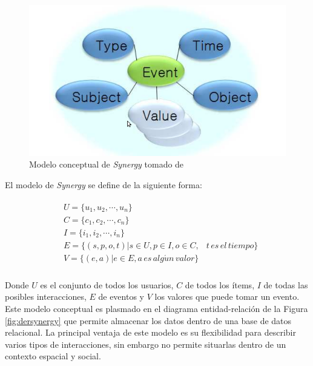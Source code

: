 \begin{figure}[tp]
	\centering
	\includegraphics[scale=.3]{images/modelosinergy.png}
	\caption{Modelo conceptual de \textit{Synergy} tomado de \citep{Babar:2010}}
	\label{fig:modeloconceptualsynergy}
\end{figure}

El modelo de \textit{Synergy} se define de la siguiente forma:

\begin{equation}
\label{modelo:eqsynergy}
\begin{split}
\begin{aligned}
	&U = \{u_1, u_2,\cdots,u_n\}\\
	&C = \{c_1, c_2,\cdots,c_n\}\\
	&I = \{i_1, i_2,\cdots,i_n\}\\
	&E = \{(s, p, o, t) | s\in U, p \in I, o \in C, &t\, es\, el\, tiempo\}\\
	&V = \{(e, a) | e \in E, a\, es\, alg\acute{u}n\, valor\}\\
\end{aligned}
\end{split}
\end{equation}

Donde $U$ es el conjunto de todos los usuarios, $C$ de todos los ítems, $I$ de todas las posibles interacciones, $E$ de eventos y $V$ los valores que puede tomar un evento. Este modelo conceptual es plasmado en el diagrama entidad-relación de la Figura \ref{fig:dersynergy} que permite almacenar los datos dentro de una base de datos relacional. La principal ventaja de este modelo es su flexibilidad para describir varios tipos de interacciones, sin embargo no permite situarlas dentro de un contexto espacial y social.

